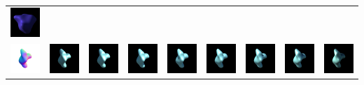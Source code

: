 \begin{center}
\begin{longtable}{@{}c@{}c@{}c@{}c@{}c@{}c@{}c@{}c@{}c@{}}
\includegraphics[width=0.1\linewidth]{training/36_7.png} \\
\includegraphics[width=0.1\linewidth]{training/37_gt.png} & \includegraphics[width=0.1\linewidth]{training/37_0.png} &
\includegraphics[width=0.1\linewidth]{training/37_1.png} & \includegraphics[width=0.1\linewidth]{training/37_2.png} &
\includegraphics[width=0.1\linewidth]{training/37_3.png} & \includegraphics[width=0.1\linewidth]{training/37_4.png} &
\includegraphics[width=0.1\linewidth]{training/37_5.png} & \includegraphics[width=0.1\linewidth]{training/37_6.png} &
\includegraphics[width=0.1\linewidth]{training/37_7.png} \\

\end{longtable}
\end{center}
